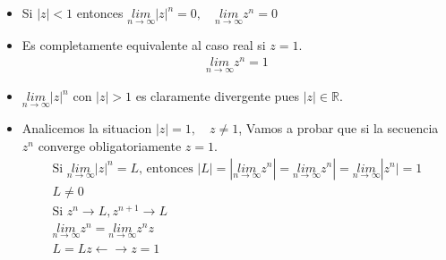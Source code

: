 \documentclass{article}
\begin{document}
\begin{itemize}
  \item Si $ |z| < 1 $ entonces $ \underset{n \rightarrow \infty}{lim }|z|^ {n } = 0, \quad \underset{n \rightarrow \infty}{lim }z ^ {n } = 0  $
  \item Es completamente equivalente al caso real si $ z = 1  $. 
    \begin{gather}
      \underset{n \rightarrow \infty}{lim }z ^ {n } = 1  
    \end{gather}
  \item $ \underset{n \rightarrow \infty}{lim }|z|^ {n } $ con $ |z|>1  $ es claramente divergente pues $ |z|\in \mathbb{R} $.
  \item Analicemos la situacion $ |z| = 1, \quad z \neq 1  $, Vamos a probar que si la secuencia $ z ^ {n } $ converge obligatoriamente $ z = 1  $. 
  \begin{gather}
    \text{Si }\underset{n \rightarrow \infty}{lim}|z|^ {n } =  L \text{, entonces }|L| = | \underset{n \rightarrow \infty}{lim }z ^ {n }| = \underset{n \rightarrow \infty}{lim }z ^ {n }| = \underset{n \rightarrow \infty}{lim }|z ^ {n }| = 1 \\
    L \neq 0 \\
    \text{Si }z ^ {n }\rightarrow L , z ^ {n +1 }\rightarrow L \\
    \underset{n \rightarrow \infty}{lim }z ^ {n } = \underset{n \rightarrow \infty}{lim }z ^ {n }z \\
    L = L z \leftarrow  \rightarrow z = 1
  \end{gather}
\end{itemize}
\end{document}
